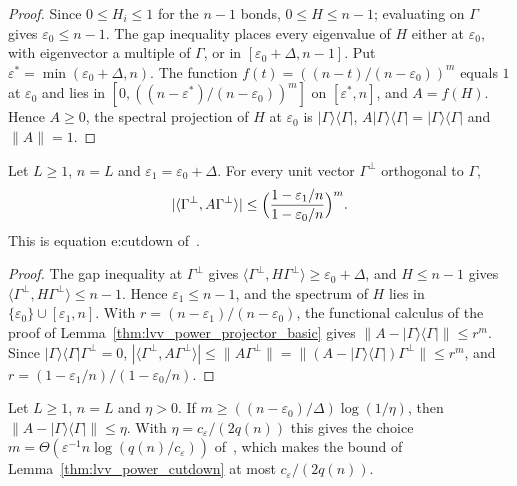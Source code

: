 \begin{proof}
    \leanok
    Since $0\le H_i\le1$ for the $n-1$ bonds, $0\le H\le n-1$; evaluating on
    $\Gamma$ gives $\varepsilon_0\le n-1$. The gap inequality places every
    eigenvalue of $H$ either at $\varepsilon_0$, with eigenvector a multiple of
    $\Gamma$, or in $[\varepsilon_0+\Delta,n-1]$. Put
    $\varepsilon^*=\min(\varepsilon_0+\Delta,n)$. The function
    $f(t)=((n-t)/(n-\varepsilon_0))^m$ equals $1$ at $\varepsilon_0$ and lies in
    $[0,((n-\varepsilon^*)/(n-\varepsilon_0))^m]$ on $[\varepsilon^*,n]$, and
    $A=f(H)$. Hence $A\ge0$, the spectral projection of $H$ at $\varepsilon_0$
    is $|\Gamma\rangle\langle\Gamma|$, $A|\Gamma\rangle\langle\Gamma|
        =|\Gamma\rangle\langle\Gamma|$ and $\|A\|=1$.
\end{proof}

\begin{lemma}
    \label{thm:lvv_power_cutdown}
    \leanok
    Let $L\ge1$, $n=L$ and $\varepsilon_1=\varepsilon_0+\Delta$. For every unit
    vector $\Gamma^\perp$ orthogonal to $\Gamma$,
    \begin{align*}
        |\langle\Gamma^\perp,A\Gamma^\perp\rangle|
        \le\Bigl(\frac{1-\varepsilon_1/n}{1-\varepsilon_0/n}\Bigr)^{m}.
    \end{align*}
    This is equation e:cutdown of~\cite[line 603]{Landau2015Polynomial}.
\end{lemma}

\begin{proof}
    \leanok
    The gap inequality at $\Gamma^\perp$ gives
    $\langle\Gamma^\perp,H\Gamma^\perp\rangle\ge\varepsilon_0+\Delta$, and
    $H\le n-1$ gives $\langle\Gamma^\perp,H\Gamma^\perp\rangle\le n-1$. Hence
    $\varepsilon_1\le n-1$, and the spectrum of $H$ lies in
    $\{\varepsilon_0\}\cup[\varepsilon_1,n]$. With
    $r=(n-\varepsilon_1)/(n-\varepsilon_0)$, the functional calculus of the
    proof of Lemma~\ref{thm:lvv_power_projector_basic} gives
    $\|A-|\Gamma\rangle\langle\Gamma|\|\le r^m$. Since
    $|\Gamma\rangle\langle\Gamma|\Gamma^\perp=0$,
    $|\langle\Gamma^\perp,A\Gamma^\perp\rangle|\le\|A\Gamma^\perp\|
        =\|(A-|\Gamma\rangle\langle\Gamma|)\Gamma^\perp\|\le r^m$, and
    $r=(1-\varepsilon_1/n)/(1-\varepsilon_0/n)$.
\end{proof}

\begin{lemma}
    \label{thm:lvv_power_threshold}
    \leanok
    Let $L\ge1$, $n=L$ and $\eta>0$. If
    $m\ge((n-\varepsilon_0)/\Delta)\log(1/\eta)$, then
    $\|A-|\Gamma\rangle\langle\Gamma|\|\le\eta$. With $\eta=c_\varepsilon/(2q(n))$
    this gives the choice $m=\Theta(\varepsilon^{-1}n\log(q(n)/c_\varepsilon))$
    of~\cite[lines 602--603]{Landau2015Polynomial}, which makes the bound of
    Lemma~\ref{thm:lvv_power_cutdown} at most $c_\varepsilon/(2q(n))$.
\end{lemma}

